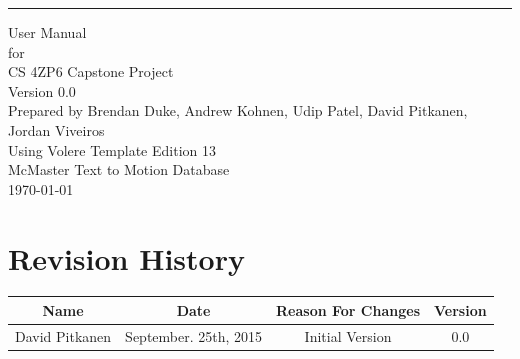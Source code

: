 \documentclass{scrreprt}
\date{}
\def\myversion{0.0 }
\begin{document}
\begin{flushright}
    \rule{16cm}{5pt}\vskip1cm
    \begin{bfseries}
        \Huge{User Manual }\\
        \vspace{1.4cm}
        for\\
        \vspace{1.4cm}
        CS 4ZP6 Capstone Project\\
        \vspace{1.4cm}
        \LARGE{Version \myversion}\\
        \vspace{1.4cm}
        Prepared by Brendan Duke, Andrew Kohnen, Udip Patel, David Pitkanen, Jordan Viveiros\\
        \vspace{1.4cm}
        Using Volere Template Edition 13\\
        \vspace{1.4cm}
        McMaster Text to Motion Database\\
        \vspace{1.4cm}
        \today\\
    \end{bfseries}
\end{flushright}

\tableofcontents

\chapter*{Revision History}

\begin{center}
    \begin{tabular}{|c|c|c|c|}
        \hline
            Name & Date & Reason For Changes & Version\\
        \hline
	    David Pitkanen & September. 25th, 2015 & Initial Version & 0.0\\
        \hline
    \end{tabular}
\end{center}

\end{document}
